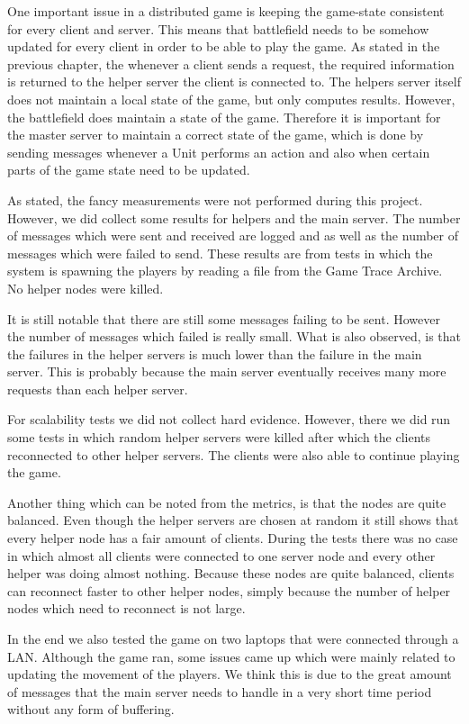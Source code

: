 One important issue in a distributed game is keeping the game-state consistent for every client and server.
This means that battlefield needs to be somehow updated for every client in order to be able to play the game.
As stated in the previous chapter, the whenever a client sends a request, the required information is returned to the helper server the client is connected to.
The helpers server itself does not maintain a local state of the game, but only computes results.
However, the battlefield does maintain a state of the game. 
Therefore it is important for the master server to maintain a correct state of the game, which is done by sending messages whenever a Unit performs an action and also when certain parts of the game state need to be updated.

As stated, the fancy measurements were not performed during this project. 
However, we did collect some results for helpers and the main server.
The number of messages which were sent and received are logged and as well as the number of messages which were failed to send.
These results are from tests in which the system is spawning the players by reading a file from the Game Trace Archive.
No helper nodes were killed.

It is still notable that there are still some messages failing to be sent. However the number of messages which failed is really small.
What is also observed, is that the failures in the helper servers is much lower than the failure in the main server.
This is probably because the main server eventually receives many more requests than each helper server.

For scalability tests we did not collect hard evidence. 
However, there we did run some tests in which random helper servers were killed after which the clients reconnected to other helper servers.
The clients were also able to continue playing the game.

Another thing which can be noted from the metrics, is that the nodes are quite balanced.
Even though the helper servers are chosen at random it still shows that every helper node has a fair amount of clients.
During the tests there was no case in which almost all clients were connected to one server node and every other helper was doing almost nothing.
Because these nodes are quite balanced, clients can reconnect faster to other helper nodes, simply because the number of helper nodes which need to reconnect is not large.

In the end we also tested the game on two laptops that were connected through a LAN. Although the game ran, some issues came up which were mainly related to updating the movement of the players. We think this is due to the great amount of messages that the main server needs to handle in a very short time period without any form of buffering.

